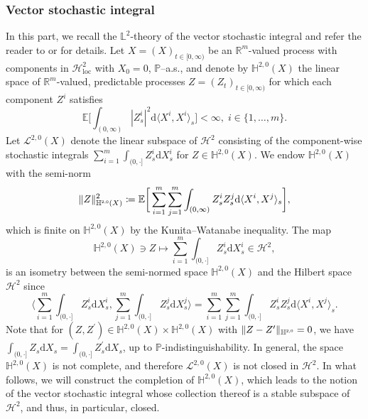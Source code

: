 \documentclass[10pt]{article} %
\newcommand\cH{\mathcal H}
\newcommand\cL{\mathcal L}
\newcommand{\smalltext}[1]{\text{\fontsize{4}{4}\selectfont$#1$}}
\def \E{\mathbb{E}}
\def \H{\mathbb{H}}
\def \L{\mathbb{L}}
\def \P{\mathbb{P}}
\def \R{\mathbb{R}}
\def\d{\mathrm{d}}
\begin{document}
\subsubsection{Vector stochastic integral}\label{sec::vector_si}

In this part, we recall the $\L^2$-theory of the vector stochastic integral and refer the reader to \cite[Section III.6]{jacod2003limit} or \cite[Section IV.2]{jacod1979calcul} for details. Let $X = (X)_{t \in [0,\infty)}$ be an $\R^m$-valued process with components in $\cH^2_\mathrm{loc}$ with $X_0 = 0$, $\P$--a.s., and denote by $\H^{2,0}(X)$ the linear space of $\R^m$-valued, predictable processes $Z=(Z_t)_{t \in [0,\infty)}$ for which each component $Z^i$ satisfies
\begin{equation*}
	\E\bigg[ \int_{(0,\infty)} |Z^i_s|^2 \d \langle X^i, X^i \rangle_s\bigg] < \infty,\; i\in\{1,\dots,m\}.
\end{equation*}
Let $\cL^{2,0}(X)$ denote the linear subspace of $\cH^2$ consisting of the component-wise stochastic integrals $\sum_{i = 1}^m \int_{(0,\cdot]} Z^i_s \d X^i_s$ for $Z \in \H^{2,0}(X)$. We endow $\H^{2,0}(X)$ with the semi-norm
\begin{equation*}
	\|Z\|^2_{\H^{\smalltext{2}\smalltext{,}\smalltext{0}}(X)} \coloneqq \E \bigg[ \sum_{i= 1}^m\sum_{j=1}^m \int_{(0,\infty)} Z^i_s Z^j_s \d \langle X^i,X^j \rangle_s \bigg],
\end{equation*}
which is finite on $\H^{2,0}(X)$ by the Kunita--Watanabe inequality. The map
\begin{equation}\label{eq::isometry}
	\H^{2,0}(X) \ni Z \longmapsto \sum_{i = 1}^m \int_{(0,\cdot]} Z^i_s \d X^i_s \in \cH^2,
\end{equation}
is an isometry between the semi-normed space $\H^{2,0}(X)$ and the Hilbert space $\cH^2$ since
\begin{equation*}
	\bigg\langle \sum_{i = 1}^m \int_{(0,\cdot]} Z^i_s \d X^i_s, \sum_{j = 1}^m \int_{(0,\cdot]} Z^j_s \d X^j_s \bigg\rangle = \sum_{i=1}^m\sum_{j=1}^m \int_{(0,\cdot]} Z^i_s Z^j_s \d \langle X^i, X^j \rangle_s.
\end{equation*}
Note that for $(Z,Z^\prime) \in \H^{2,0}(X) \times \H^{2,0}(X)$ with $\|Z-Z^\prime\|_{\H^{\smalltext{2}\smalltext{,}\smalltext{0}}}=0$, we have $\int_{(0,\cdot]} Z_s \d X_s = \int_{(0,\cdot]} Z^\prime_s \d X_s$, up to $\P$-indistinguishability. In general, the space $\H^{2,0}(X)$ is not complete, and therefore $\cL^{2,0}(X)$ is not closed in $\cH^2$. In what follows, we will construct the completion of $\H^{2,0}(X)$, which leads to the notion of the vector stochastic integral whose collection thereof is a stable subspace of $\cH^2$, and thus, in particular, closed.
\end{document}
